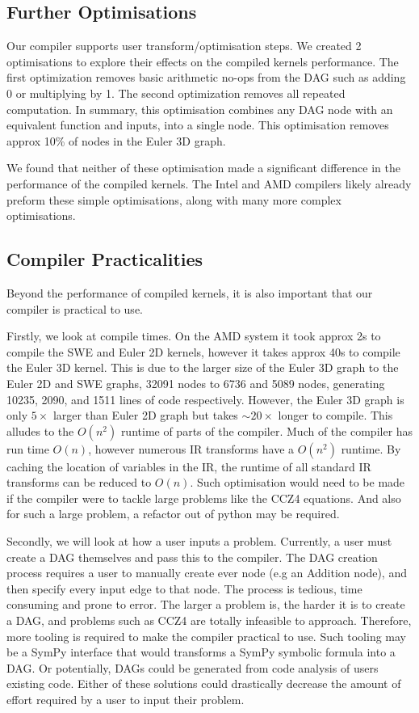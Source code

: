 \subsection{Further Optimisations}

Our compiler supports user transform/optimisation steps.
We created 2 optimisations to explore their effects on the compiled kernels performance.
The first optimization removes basic arithmetic no-ops from the DAG such as adding 0 or multiplying by 1.
The second optimization removes all repeated computation.
In summary, this optimisation combines any DAG node with an equivalent function and inputs, into a single node.
This optimisation removes approx 10\% of nodes in the Euler 3D graph.

We found that neither of these optimisation made a significant difference in the performance of the compiled kernels.
The Intel and AMD compilers likely already preform these simple optimisations, along with many more complex optimisations.

\subsection{Compiler Practicalities} \label{sec:practical}
Beyond the performance of compiled kernels, it is also important that our compiler is practical to use.

Firstly, we look at compile times.
On the AMD system it took approx 2s to compile the SWE and Euler 2D kernels, however it takes approx 40s to compile the Euler 3D kernel.
This is due to the larger size of the Euler 3D graph to the Euler 2D and SWE graphs, 32091 nodes to 6736 and 5089 nodes, generating 10235, 2090, and 1511 lines of code respectively.
However, the Euler 3D graph is only $5\times$ larger than Euler 2D graph but takes $\sim 20\times$ longer to compile.
This alludes to the $O(n^2)$ runtime of parts of the compiler.
Much of the compiler has run time $O(n)$, however numerous IR transforms have a $O(n^2)$ runtime.
By caching the location of variables in the IR, the runtime of all standard IR transforms can be reduced to $O(n)$.
Such optimisation would need to be made if the compiler were to tackle large problems like the CCZ4 equations.
And also for such a large problem, a refactor out of python may be required.

Secondly, we will look at how a user inputs a problem.
Currently, a user must create a DAG themselves and pass this to the compiler.
The DAG creation process requires a user to manually create ever node (e.g an Addition node), and then specify every input edge to that node.
The process is tedious, time consuming and prone to error.
The larger a problem is, the harder it is to create a DAG, and problems such as CCZ4 are totally infeasible to approach.
Therefore, more tooling is required to make the compiler practical to use.
Such tooling may be a SymPy interface that would transforms a SymPy symbolic formula into a DAG.
Or potentially, DAGs could be generated from code analysis of users existing code.
Either of these solutions could drastically decrease the amount of effort required by a user to input their problem.  